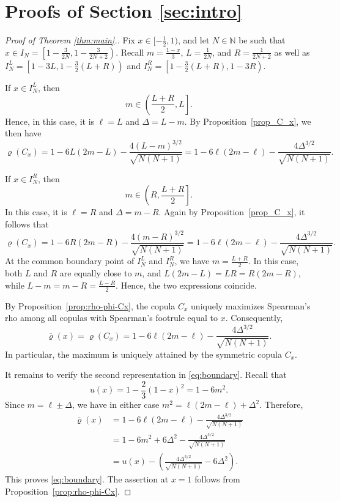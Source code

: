 \documentclass{article}
\begin{document}
\section{Proofs of Section \ref{sec:intro}}\label{sec:proof1}




\begin{proof}[Proof of Theorem \ref{thm:main}.]
Fix \(x\in[-\frac12,1)\), and let \(N\in\mathbb N\) be such that \(x\in I_N = \left[1-\frac{3}{2N}, 1-\frac{3}{2N+2}\right)\).
Recall \(m=\frac{1-x}{3}\), \(L=\frac{1}{2N}\), and \(R=\frac{1}{2N+2}\) as well as \(I_N^L = \left[ 1-3L, 1-\frac 3 2 (L+R)\right)\) and \(I_N^R= \left[1-\frac 3 2 (L+R), 1-3R\right)\).

If \(x\in I_N^L\), then
\[
    m\in\left(\frac{L+R}{2},L\right].
\]
Hence, in this case, it is \(\ell=L\) and \(\Delta=L-m\).
By Proposition~\ref{prop_C_x}, we then have
\[
    \varrho(C_x)
    =
    1-6L(2m-L)
    -
    \frac{4(L-m)^{3/2}}{\sqrt{N(N+1)}} = 1-6\ell(2m-\ell)
    -
    \frac{4\Delta^{3/2}}{\sqrt{N(N+1)}}.
\]

If \(x\in I_N^R\), then
\[
    m\in\left(R,\frac{L+R}{2}\right].
\]
In this case, it is \(\ell=R\) and \(\Delta=m-R\).
Again by Proposition~\ref{prop_C_x}, it follows that
\[
    \varrho(C_x)
    =
    1-6R(2m-R)
    -
    \frac{4(m-R)^{3/2}}{\sqrt{N(N+1)}}
    =
    1-6\ell(2m-\ell)
    -
    \frac{4\Delta^{3/2}}{\sqrt{N(N+1)}}.
\]
At the common boundary point of \(I_N^L\) and \(I_N^R\), we have \( m=\frac{L+R}{2}\).
In this case, both \(L\) and \(R\) are equally close to \(m\), and \(L(2m-L)=LR=R(2m-R)\), while \(L-m=m-R=\frac{L-R}{2}\).
Hence, the two expressions coincide.

By Proposition~\ref{prop:rho-phi-Cx}, the copula \(C_x\) uniquely maximizes Spearman's rho among all copulas with Spearman's footrule equal to \(x\).
Consequently,
\[
    \overline{\varrho}(x)
    =
    \varrho(C_x)
    =
    1-6\ell(2m-\ell)
    -
    \frac{4\Delta^{3/2}}{\sqrt{N(N+1)}}.
\]
In particular, the maximum is uniquely attained by the symmetric copula \(C_x\).

It remains to verify the second representation in \eqref{eq:boundary}.
Recall that
\[
    u(x)
    =
    1-\frac{2}{3}(1-x)^2
    =
    1-6m^2.
\]
Since \(m=\ell\pm\Delta\), we have in either case \(m^2 = \ell(2m-\ell)+\Delta^2 \).
Therefore,
\begin{align*}
    \overline{\varrho}(x)
    &=
    1-6\ell(2m-\ell)
    -
    \frac{4\Delta^{3/2}}{\sqrt{N(N+1)}}\\
    &=
    1-6m^2+6\Delta^2
    -
    \frac{4\Delta^{3/2}}{\sqrt{N(N+1)}}\\
    &=
    u(x)
    -
    \left(
        \frac{4\Delta^{3/2}}{\sqrt{N(N+1)}}
        -
        6\Delta^2
    \right).
\end{align*}
This proves \eqref{eq:boundary}.
The assertion at \(x=1\) follows from Proposition~\ref{prop:rho-phi-Cx}.
\end{proof}
\end{document}
